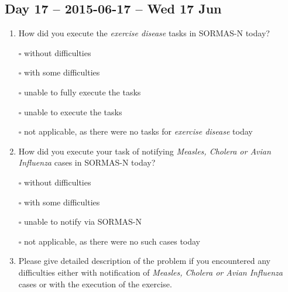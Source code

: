 \documentclass[a4paper, titlepage]{tufte-handout}
\begin{document}
\subsection{Day 17 -- 2015-06-17 -- Wed 17 Jun}
\label{sec-8-13}
\begin{enumerate}
\item How did you execute the \emph{exercise disease} tasks in SORMAS-N today?

\quad $\square$ without difficulties

\quad $\square$ with some difficulties

\quad $\square$ unable to fully execute the tasks

\quad $\square$ unable to execute the tasks

\quad $\square$ not applicable, as there were no tasks for \emph{exercise disease} today

\item How did you execute your task of notifying \emph{Measles, Cholera or Avian Influenza} cases in SORMAS-N today?

\quad $\square$ without difficulties

\quad $\square$ with some difficulties

\quad $\square$ unable to notify via SORMAS-N

\quad $\square$ not applicable, as there were no such cases today

\item Please give detailed description of the problem if you encountered any difficulties either with notification of \emph{Measles, Cholera or Avian Influenza} cases or with the execution of the exercise.

\hrulefill

\hrulefill

\hrulefill

\hrulefill

\hrulefill

\hrulefill

\hrulefill

\hrulefill

\hrulefill

\hrulefill
\end{enumerate}

\newpage
\end{document}
